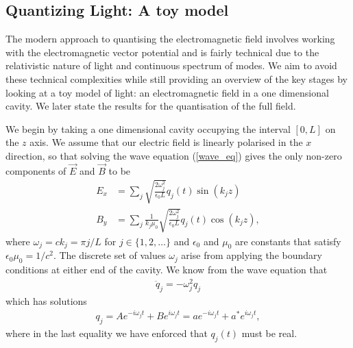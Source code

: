 \subsection{Quantizing Light: A toy model}

The modern approach to quantising the electromagnetic field involves working with the electromagnetic vector potential and is fairly technical due to the relativistic nature of light and continuous spectrum of modes. We aim to avoid these technical complexities while still providing an overview of the key stages by looking at a toy model of light: an electromagnetic field in a one dimensional cavity. We later state the results for the quantisation of the full field.

We begin by taking a one dimensional cavity occupying the interval $[0, L]$ on the $z$ axis. We assume that our electric field is linearly polarised in the $x$ direction, so that solving the wave equation (\ref{wave_eq}) gives the only non-zero components of $\vec{E}$ and $\vec{B}$ to be
\begin{align}\label{toy_classical_e}
  E_x &= \sum_j \sqrt{\frac{2\omega_j^2}{\epsilon_0 L}} q_j(t) \sin(k_j z) \\
  B_y &= \sum_j \frac{1}{k_j \mu_0} \sqrt{\frac{2\omega_j^2}{\epsilon_0 L}} q_j(t) \cos(k_j z),
\end{align}
where $\omega_j = ck_j = \pi j/L$ for $j \in \{1, 2, \dots\}$ and $\epsilon_0$ and $\mu_0$ are constants that satisfy $\epsilon_0 \mu_0 = 1/c^2$. The discrete set of values $\omega_j$ arise from applying the boundary conditions at either end of the cavity. We know from the wave equation that
\begin{align}
  \ddot{q}_j = -\omega_j^2 q_j
\end{align}
which has solutions
\begin{align}\label{classical_q}
  q_j = Ae^{-i\omega_j t} + Be^{i\omega_j t} = ae^{-i\omega_j t} + a^*e^{i\omega_j t},
\end{align}
where in the last equality we have enforced that $q_j(t)$ must be real.

